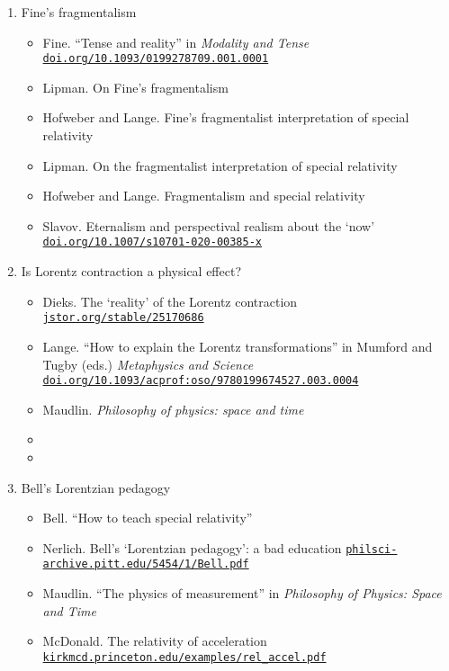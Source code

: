 \documentclass[11pt]{article}
\newcommand\rurl[1]{%
  \href{http://#1}{\nolinkurl{#1}}%
}
\begin{document}
\begin{enumerate}
\item Fine's fragmentalism
  \begin{itemize}
  \item Fine. ``Tense and reality'' in \emph{Modality and Tense}
    \rurl{doi.org/10.1093/0199278709.001.0001}
  \item Lipman. On Fine's fragmentalism
  \item Hofweber and Lange. Fine’s fragmentalist interpretation of special relativity
  \item Lipman. On the fragmentalist interpretation of special relativity
  \item Hofweber and Lange. Fragmentalism and special relativity
  \item Slavov. Eternalism and perspectival realism about the `now'\,
    \rurl{doi.org/10.1007/s10701-020-00385-x}
  \end{itemize}

\item Is Lorentz contraction a physical effect?
  \begin{itemize}
  \item Dieks. The `reality' of the Lorentz contraction
    \rurl{jstor.org/stable/25170686}
  \item Lange. ``How to explain the Lorentz transformations'' in
    Mumford and Tugby (eds.) \textit{Metaphysics and Science}
    \rurl{doi.org/10.1093/acprof:oso/9780199674527.003.0004}
  \item Maudlin. \textit{Philosophy of physics: space and time}
  \item {}
  \item {}  
  \end{itemize}
  
\item Bell's Lorentzian pedagogy 
  \begin{itemize}
  \item Bell. ``How to teach special relativity''
  \item Nerlich. Bell's `Lorentzian pedagogy': a bad education
    \rurl{philsci-archive.pitt.edu/5454/1/Bell.pdf}
  \item Maudlin. ``The physics of measurement'' in \emph{Philosophy of
      Physics: Space and Time}
  \item McDonald. The relativity of acceleration
    \rurl{kirkmcd.princeton.edu/examples/rel_accel.pdf}
  \end{itemize}


\end{enumerate}
\end{document}
